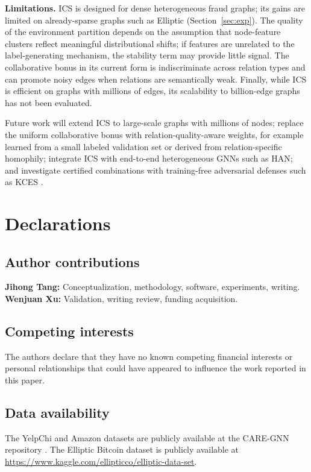 \documentclass[11pt]{article}
\begin{document}
\textbf{Limitations.} ICS is designed for dense heterogeneous fraud graphs; its gains are limited on already-sparse graphs such as Elliptic (Section~\ref{sec:exp}). The quality of the environment partition depends on the assumption that node-feature clusters reflect meaningful distributional shifts; if features are unrelated to the label-generating mechanism, the stability term may provide little signal. The collaborative bonus in its current form is indiscriminate across relation types and can promote noisy edges when relations are semantically weak. Finally, while ICS is efficient on graphs with millions of edges, its scalability to billion-edge graphs has not been evaluated.

Future work will extend ICS to large-scale graphs with millions of nodes; replace the uniform collaborative bonus with relation-quality-aware weights, for example learned from a small labeled validation set or derived from relation-specific homophily; integrate ICS with end-to-end heterogeneous GNNs such as HAN; and investigate certified combinations with training-free adversarial defenses such as KCES \cite{jia2026kces}.

\section*{Declarations}

\subsection*{Author contributions}
\textbf{Jihong Tang:} Conceptualization, methodology, software, experiments, writing. \textbf{Wenjuan Xu:} Validation, writing review, funding acquisition.

\subsection*{Competing interests}
The authors declare that they have no known competing financial interests or personal relationships that could have appeared to influence the work reported in this paper.

\subsection*{Data availability}
The YelpChi and Amazon datasets are publicly available at the CARE-GNN repository \cite{dou2020caregnn}. The Elliptic Bitcoin dataset is publicly available at \url{https://www.kaggle.com/ellipticco/elliptic-data-set}.
\end{document}
